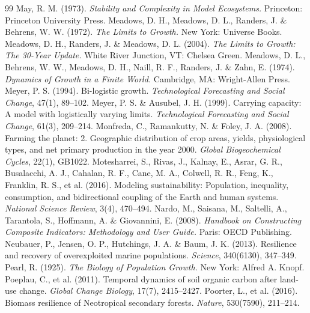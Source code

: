\documentclass[preprint,12pt,authoryear]{elsarticle}
\begin{document}
\begin{thebibliography}{99}
 May, R. M. (1973). \emph{Stability and Complexity in Model Ecosystems.} Princeton: Princeton University Press.
 Meadows, D. H., Meadows, D. L., Randers, J. \& Behrens, W. W. (1972). \emph{The Limits to Growth.} New York: Universe Books.
 Meadows, D. H., Randers, J. \& Meadows, D. L. (2004). \emph{The Limits to Growth: The 30-Year Update.} White River Junction, VT: Chelsea Green.
 Meadows, D. L., Behrens, W. W., Meadows, D. H., Naill, R. F., Randers, J. \& Zahn, E. (1974). \emph{Dynamics of Growth in a Finite World.} Cambridge, MA: Wright-Allen Press.
 Meyer, P. S. (1994). Bi-logistic growth. \emph{Technological Forecasting and Social Change}, 47(1), 89--102.
 Meyer, P. S. \& Ausubel, J. H. (1999). Carrying capacity: A model with logistically varying limits. \emph{Technological Forecasting and Social Change}, 61(3), 209--214.
 Monfreda, C., Ramankutty, N. \& Foley, J. A. (2008). Farming the planet: 2. Geographic distribution of crop areas, yields, physiological types, and net primary production in the year 2000. \emph{Global Biogeochemical Cycles}, 22(1), GB1022.
 Motesharrei, S., Rivas, J., Kalnay, E., Asrar, G. R., Busalacchi, A. J., Cahalan, R. F., Cane, M. A., Colwell, R. R., Feng, K., Franklin, R. S., et al. (2016). Modeling sustainability: Population, inequality, consumption, and bidirectional coupling of the Earth and human systems. \emph{National Science Review}, 3(4), 470--494.
 Nardo, M., Saisana, M., Saltelli, A., Tarantola, S., Hoffmann, A. \& Giovannini, E. (2008). \emph{Handbook on Constructing Composite Indicators: Methodology and User Guide.} Paris: OECD Publishing.
 Neubauer, P., Jensen, O. P., Hutchings, J. A. \& Baum, J. K. (2013). Resilience and recovery of overexploited marine populations. \emph{Science}, 340(6130), 347--349.
 Pearl, R. (1925). \emph{The Biology of Population Growth.} New York: Alfred A. Knopf.
 Poeplau, C., et al. (2011). Temporal dynamics of soil organic carbon after land-use change. \emph{Global Change Biology}, 17(7), 2415--2427.
 Poorter, L., et al. (2016). Biomass resilience of Neotropical secondary forests. \emph{Nature}, 530(7590), 211--214.

\end{thebibliography}
\end{document}
